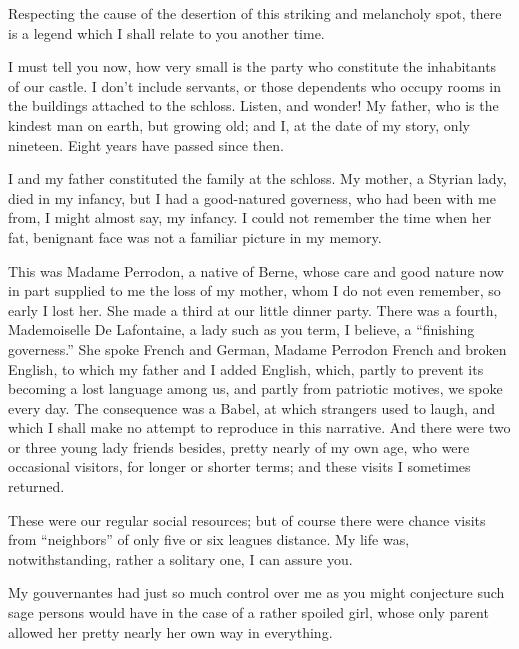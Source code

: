 \documentclass[11pt,twoside,makeidx,hidelinks,]{memoir}
\begin{document}
Respecting the cause of the desertion of this striking and melancholy
spot, there is a legend which I shall relate to you another time.

I must tell you now, how very small is the party who constitute the
inhabitants of our castle. I don't include servants, or those dependents
who occupy rooms in the buildings attached to the schloss. Listen, and
wonder! My father, who is the kindest man on earth, but growing old; and
I, at the date of my story, only nineteen. Eight years have passed
since then.

I and my father constituted the family at the schloss. My mother, a
Styrian lady, died in my infancy, but I had a good-natured governess,
who had been with me from, I might almost say, my infancy. I could not
remember the time when her fat, benignant face was not a familiar
picture in my memory.

This was Madame Perrodon, a native of Berne, whose care and good nature
now in part supplied to me the loss of my mother, whom I do not even
remember, so early I lost her. She made a third at our little dinner
party. There was a fourth, Mademoiselle De Lafontaine, a lady such as
you term, I believe, a ``finishing governess.'' She spoke French and
German, Madame Perrodon French and broken English, to which my father
and I added English, which, partly to prevent its becoming a lost
language among us, and partly from patriotic motives, we spoke every
day. The consequence was a Babel, at which strangers used to laugh, and
which I shall make no attempt to reproduce in this narrative. And there
were two or three young lady friends besides, pretty nearly of my own
age, who were occasional visitors, for longer or shorter terms; and
these visits I sometimes returned.

These were our regular social resources; but of course there were chance
visits from ``neighbors'' of only five or six leagues distance. My life
was, notwithstanding, rather a solitary one, I can assure you.

My gouvernantes had just so much control over me as you might conjecture
such sage persons would have in the case of a rather spoiled girl, whose
only parent allowed her pretty nearly her own way in everything.
\end{document}
